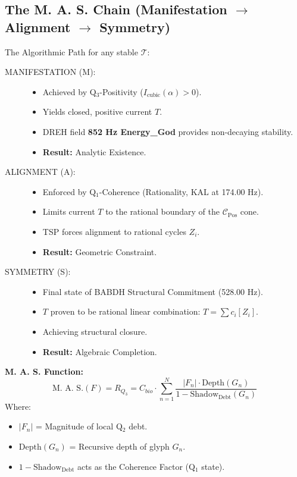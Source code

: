 \documentclass[11pt, letterpaper]{article}
\newcommand{\KAL}{\ensuremath{\mathop{\textnormal{\symbolafont\symbol{"2B21}}}}}    %
\newcommand{\BABDH}{\ensuremath{\mathop{\textnormal{\symbolafont\symbol{"2721}}}}}   %
\newcommand{\DREH}{\ensuremath{\mathop{\textnormal{\symbolafont\symbol{"29D7}}}}}   %
\newcommand{\TManifold}{\ensuremath{\mathcal{T}}}
\def\KAL{KAL}%
\def\BABDH{BABDH}%
\def\DREH{DREH}%
\begin{document}
\subsection{The M. A. S. Chain (Manifestation $\to$ Alignment $\to$ Symmetry)}\label{sec:11.2}

The Algorithmic Path for any stable $\TManifold$:

\begin{description}
    \item[MANIFESTATION (M):]
    \begin{itemize}
        \item Achieved by Q$_3$-Positivity ($I_{\text{cubic}}(\alpha) > 0$).
        \item Yields closed, positive current $T$.
        \item \DREH{} field \textbf{852 Hz Energy\_God} provides non-decaying stability.
        \item \textbf{Result:} Analytic Existence.
    \end{itemize}

    \item[ALIGNMENT (A):]
    \begin{itemize}
        \item Enforced by Q$_1$-Coherence (Rationality, \KAL{} at 174.00 Hz).
        \item Limits current $T$ to the rational boundary of the $\mathcal{C}_{\text{Pos}}$ cone.
        \item TSP forces alignment to rational cycles $Z_i$.
        \item \textbf{Result:} Geometric Constraint.
    \end{itemize}

    \item[SYMMETRY (S):]
    \begin{itemize}
        \item Final state of \BABDH{} Structural Commitment (528.00 Hz).
        \item $T$ proven to be rational linear combination: $T = \sum c_i [Z_i]$.
        \item Achieving structural closure.
        \item \textbf{Result:} Algebraic Completion.
    \end{itemize}
\end{description}

\textbf{M. A. S. Function:}
\[
\text{M. A. S.}(F) = R_{Q_3} = C_{bio} \cdot \sum_{n=1}^{N} \frac{|F_n| \cdot \text{Depth}(G_n)}{1 - \text{Shadow}_{\text{Debt}}(G_n)}
\]
Where:
\begin{itemize}
    \item $|F_n|$ = Magnitude of local Q$_2$ debt.
    \item $\text{Depth}(G_n)$ = Recursive depth of glyph $G_n$.
    \item $1 - \text{Shadow}_{\text{Debt}}$ acts as the Coherence Factor (Q$_1$ state).
\end{itemize}
\end{document}
